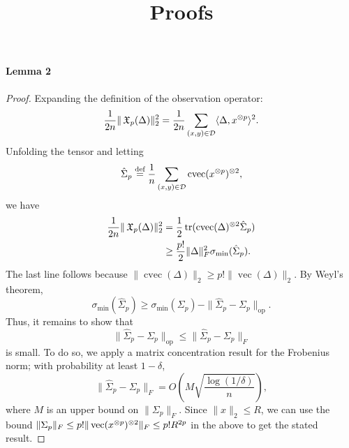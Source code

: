 \documentclass[tablecaption=bottom]{jmlr}
\title{Proofs}
\author{\Name{Arun Tejasvi Chaganty} \Email{chaganty@stanford.edu}}
\newcommand\eqdef{\ensuremath{\stackrel{\textrm{def}}{=}}} %
\newcommand\sD{\ensuremath{\mathcal{D}}}
\newcommand\sigmamin{\sigma_\textrm{min}}
\newcommand{\Lop}{\textrm{op}}
\DeclareMathOperator{\cvec} {cvec}
\DeclareMathOperator{\vvec} {vec}
\begin{document}
\maketitle

\paragraph{Lemma 2}

\begin{proof}
Expanding the definition of the observation operator:
$$\frac{1}{2n} \|\opX_p(\Delta)\|_2^2 = \frac{1}{2n} \sum_{(x,y) \in \sD} \innerp{\Delta}{x\tp{p}}^2.$$
Unfolding the tensor and letting $$\hat\Sigma_p \eqdef \frac{1}{n} \sum_{(x,y) \in \sD} \cvec(x\tp{p})\tp{2},$$
we have 
\begin{align}
\frac{1}{2n} \|\opX_p(\Delta)\|_2^2 
  &= \frac{1}{2} \trace(\cvec(\Delta)\tp{2} \hat\Sigma_p) \\
  &\ge \frac{p!}{2} \|\Delta\|_F^2 \sigmamin(\hat\Sigma_p).
\end{align}
The last line follows because $\|\cvec(\Delta)\|_2 \ge
p! \|\vvec(\Delta)\|_2$.  By Weyl's theorem, $$\sigmamin(\hat\Sigma_p) \ge
\sigmamin(\Sigma_p) - \|\hat\Sigma_p - \Sigma_p\|_\Lop.$$ Thus, it
remains to show that $$\|\hat\Sigma_p - \Sigma_p\|_\Lop \le
\|\hat\Sigma_p - \Sigma_p\|_{F}$$ is small.  To do so, we apply a matrix
concentration result for the Frobenius norm\citationneeded; with
probability at least $1 - \delta$, $$\| \hat\Sigma_p - \Sigma_p \|_F
= O\left( M \sqrt{\frac{\log(1/\delta)}{n}} \right),$$ where $M$ is an
upper bound on $\| \Sigma_p \|_F$. Since $\|x\|_2 \le R$, we can use the
bound $\| \Sigma_p \|_F \le p! \| \vvec(x\tp{p})\tp{2} \|_F \le p!
R^{2p}$ in the above to get the stated result. 

\end{proof}
\end{document}
